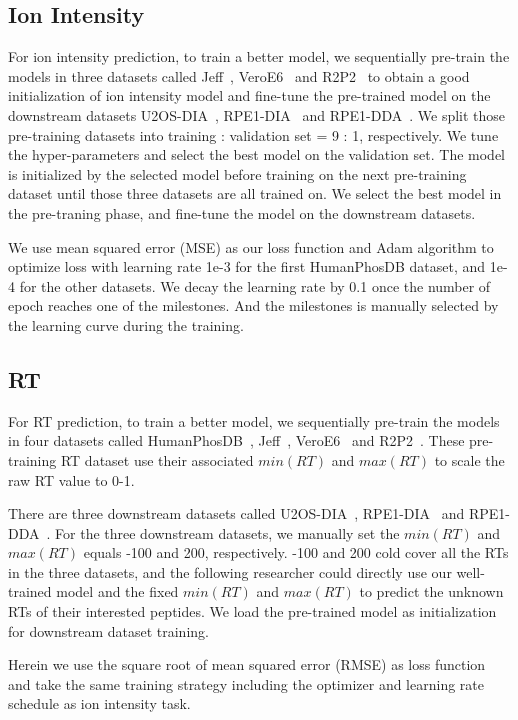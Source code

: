 

\subsection{Ion Intensity}
For ion intensity prediction, to train a better model, we sequentially pre-train the models in three datasets called Jeff~\cite{liu2018vivo}, VeroE6~\cite{bouhaddou2020global} and R2P2~\cite{leutert2019r2} to obtain a good initialization of ion intensity model and fine-tune the pre-trained model on the downstream datasets U2OS-DIA~\cite{wang2020naguider}, RPE1-DIA~\cite{bekker2020rapid} and RPE1-DDA~\cite{bekker2020rapid}. 
We split those pre-training datasets into training : validation set = 9 : 1, respectively. We tune the hyper-parameters and select the best model on the validation set. The model is initialized by the selected model before training on the next pre-training dataset until those three datasets are all trained on.
We select the best model in the pre-traning phase, and fine-tune the model on the downstream datasets.

We use mean squared error (MSE) as our loss function and Adam algorithm to optimize loss with learning rate 1e-3 for the first HumanPhosDB dataset, and 1e-4 for the other datasets. We decay the learning rate by 0.1 once the number of epoch reaches one of the milestones. And the milestones is manually selected by the learning curve during the training. 


\subsection{RT}
For RT prediction, to train a better model, we sequentially pre-train the models in four datasets called 
HumanPhosDB~\cite{lawrence2016plug}, Jeff~\cite{liu2018vivo}, VeroE6~\cite{bouhaddou2020global}
and R2P2~\cite{leutert2019r2}.  These pre-training RT dataset use their associated $min(RT)$ and $max(RT)$ to scale the raw RT value to 0-1. 

There are three downstream datasets called U2OS-DIA~\cite{wang2020naguider}, RPE1-DIA~\cite{bekker2020rapid} and RPE1-DDA~\cite{bekker2020rapid}. For the three downstream datasets, we manually set the $min(RT)$ and $max(RT)$ equals -100 and 200, respectively. -100 and 200 cold cover all the RTs in the three datasets, and the following researcher could directly use our well-trained model and the fixed $min(RT)$ and $max(RT)$ to predict the unknown RTs of their interested peptides. We load the pre-trained model as initialization for downstream dataset training. 

Herein we use the square root of mean squared error (RMSE) as loss function and take the same training strategy including the optimizer and learning rate schedule as ion intensity task.